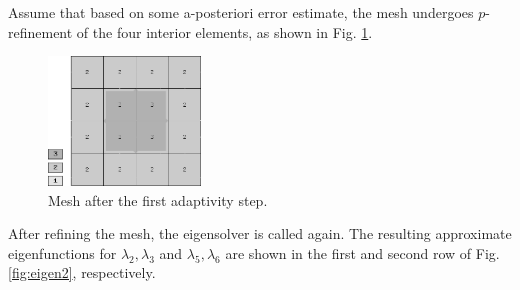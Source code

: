 \documentclass[preprint,12pt]{elsarticle}
\begin{document}
Assume that based on some a-posteriori error estimate, the mesh undergoes 
$p$-refinement of the four interior elements, as shown in Fig. \ref{fig:mesh2}.

\begin{figure}[!ht]
\begin{center}
\includegraphics[width=0.36\textwidth]{img/mesh_2.png}
\end{center}
\vspace{-5mm}
\caption{Mesh after the first adaptivity step.}
\label{fig:mesh2}
\end{figure}

After refining the mesh, the eigensolver is called again. 
The resulting approximate eigenfunctions for $\lambda_2, \lambda_3$ and $\lambda_5, \lambda_6$
are shown in the first and second row of Fig. \ref{fig:eigen2}, respectively.
\end{document}

